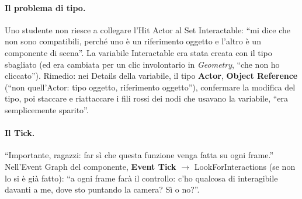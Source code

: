 \paragraph{Il problema di tipo.} Uno studente non riesce a collegare l'Hit Actor al Set
Interactable: ``mi dice che non sono compatibili, perché uno è un riferimento oggetto e
l'altro è un componente di scena''. La variabile Interactable era stata creata con il tipo
sbagliato (ed era cambiata per un clic involontario in \emph{Geometry}, ``che non ho
cliccato''). Rimedio: nei Details della variabile, il tipo \textbf{Actor}, \textbf{Object
Reference} (``non quell'Actor: tipo oggetto, riferimento oggetto''), confermare la
modifica del tipo, poi staccare e riattaccare i fili rossi dei nodi che usavano la
variabile, ``era semplicemente sparito''.

\paragraph{Il Tick.} ``Importante, ragazzi: far sì che questa funzione venga fatta su ogni
frame.'' Nell'Event Graph del componente, \textbf{Event Tick} $\rightarrow$
LookForInteractions (se non lo si è già fatto): ``a ogni frame farà il controllo: c'ho
qualcosa di interagibile davanti a me, dove sto puntando la camera? Sì o no?''.

